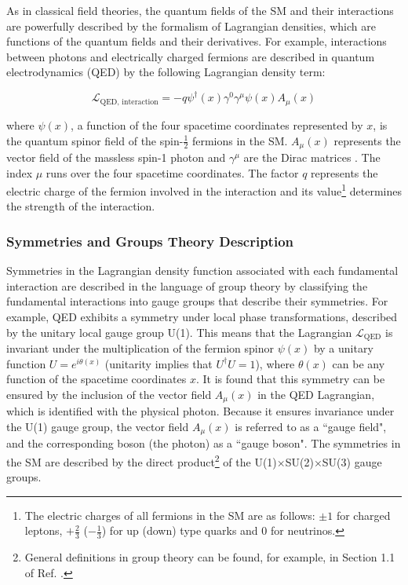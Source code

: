 As in classical field theories, the quantum fields of the SM and their interactions are powerfully described by the formalism of Lagrangian densities, which are functions of the quantum fields and their derivatives. For example, interactions between photons and electrically charged fermions are described in quantum electrodynamics (QED) by the following Lagrangian density term:

\begin{equation}
\label{eq:qed_interaction}
\mathcal{L}_\text{QED, interaction} = -q\psi^\dagger(x)\gamma^0\gamma^\mu\psi(x) A_\mu(x)
\end{equation}

\noindent where \(\psi(x)\), a function of the four spacetime coordinates represented by \(x\), is the quantum spinor field of the spin-\(\frac{1}{2}\) fermions in the SM. \(A_\mu(x)\) represents the vector field of the massless spin-1 photon and \(\gamma^\mu\) are the Dirac matrices \cite{griffiths_2008}. The index \(\mu\) runs over the four spacetime coordinates. The factor \(q\) represents the electric charge of the fermion involved in the interaction and its value\footnote{The electric charges of all fermions in the SM are as follows: \(\pm1\) for charged leptons, \(+\frac{2}{3}\) (\(-\frac{1}{3}\)) for up (down) type quarks and 0 for neutrinos.} determines the strength of the interaction. 

\subsubsection{Symmetries and Groups Theory Description}

Symmetries in the Lagrangian density function associated with each fundamental interaction are described in the language of group theory by classifying the fundamental interactions into gauge groups that describe their symmetries. For example, QED exhibits a symmetry under local phase transformations, described by the unitary local gauge group U(1). This means that the Lagrangian \(\mathcal{L}_\text{QED}\) is invariant under the multiplication of the fermion spinor \(\psi(x)\) by a unitary function \(U = e^{i\theta(x)}\) (unitarity implies that \(U^\dagger U=1\)),
where \(\theta(x)\) can be any function of the spacetime coordinates \(x\). It is found that this symmetry can be ensured by the inclusion of the vector field \(A_\mu(x)\) in the QED Lagrangian, which is identified with the physical photon. Because it ensures invariance under the U(1) gauge group, the vector field \(A_\mu(x)\) is referred to as a ``gauge field", and the corresponding boson (the photon) as a ``gauge boson". The symmetries in the SM are described by the direct product\footnote{General definitions in group theory can be found, for example, in Section 1.1 of Ref. \cite{costa2012symmetries}.} of the U(1)\(\times\)SU(2)\(\times\)SU(3) gauge groups. 

